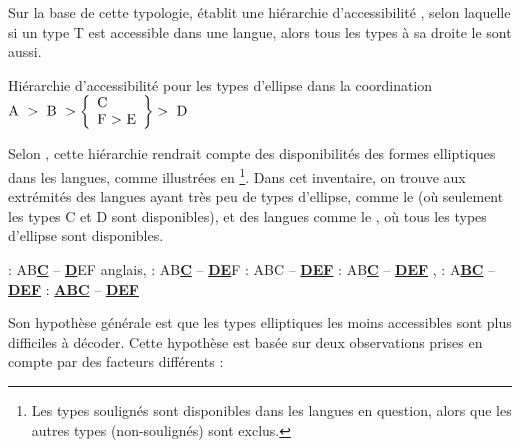 Sur la base de cette typologie, \citet{Sanders1977} établit une hiérarchie d’accessibili\-té , selon laquelle si un type T est accessible dans une langue, alors tous les types à sa droite le sont aussi.

\ea \label{ch1:ex95}
Hiérarchie d’accessibilité pour les types d’ellipse dans la coordination \\
${\displaystyle \text{A } > \text{ B } > \left\{\begin{array}{ll}
                                 \text{C}\\
                                 \text{F~\textgreater~E}
                                \end{array}\right\} > \text{ D}}$
%
\z

Selon \citet{Sanders1977}, cette hiérarchie rendrait compte des disponibilités des formes elliptiques dans les langues, comme illustrées en \footnote{Les types soulignés sont disponibles dans les langues en question, alors que les autres types (non-soulignés) sont exclus.}. Dans cet inventaire, on trouve aux extrémités des langues ayant très peu de types d’ellipse, comme le  (où seulement les types C et D sont disponibles), et des langues comme le , où tous les types d’ellipse sont disponibles. 

\ea \label{ch1:ex96}
\ea  {} : \hspace{17.5mm} AB\textbf{\uline{C}} – \textbf{\uline{D}}EF  %
\ex  anglais,  : \hspace{3mm} AB\textbf{\uline{C}} – \textbf{\uline{DE}}F
\ex  {} : \hspace{16mm} ABC – \textbf{\uline{DEF}}
\ex  {} : \hspace{21mm} AB\textbf{\uline{C}} – \textbf{\uline{DEF}}
\ex  {},  : \hspace{7.5mm} A\textbf{\uline{BC}} – \textbf{\uline{DEF}}
\ex  {} : \hspace{16mm} \textbf{\uline{ABC}} – \textbf{\uline{DEF}}       
\z
\z

Son hypothèse générale est que les types elliptiques les moins accessibles sont plus difficiles à décoder. Cette hypothèse est basée sur deux observations prises en compte par des facteurs différents : 

